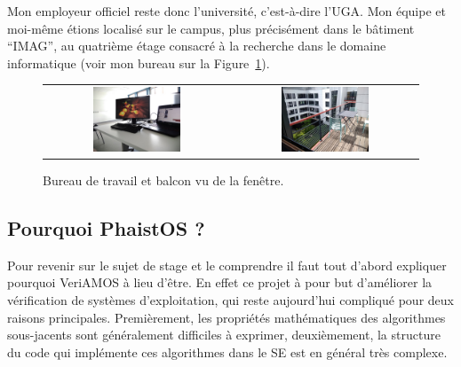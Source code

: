 Mon employeur officiel reste donc l'université, c'est-à-dire l'UGA. Mon équipe et moi-même étions localisé sur le campus, plus précisément dans le bâtiment ``IMAG'', au quatrième étage consacré à la recherche dans le domaine informatique (voir mon bureau sur la Figure~\ref{fig:imag}).

\begin{figure}[h!t] \centering
    \begin{tabular}{@{}c@{\hspace{5pt}}c@{}}
    \includegraphics[width=0.49\textwidth]{images/desk} & \includegraphics[width=0.49\textwidth]{images/balcony}
    \end{tabular}
    \caption{Bureau de travail et balcon vu de la fenêtre.}
    \label{fig:imag}
\end{figure}

\subsection{Pourquoi PhaistOS ?}

Pour revenir sur le sujet de stage et le comprendre il faut tout d'abord expliquer pourquoi VeriAMOS à lieu d'être. En effet ce projet à pour but d'améliorer la vérification de systèmes d'exploitation, qui reste aujourd'hui compliqué pour deux raisons principales. Premièrement, les propriétés mathématiques des algorithmes sous-jacents sont généralement difficiles à exprimer, deuxièmement, la structure du code qui implémente ces algorithmes dans le SE est en général très complexe. 

